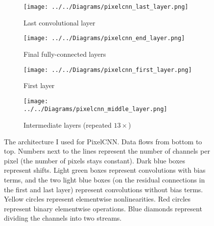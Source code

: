 \documentclass[10pt,a4paper]{article}
\begin{document}
\begin{figure}
  \centering
  \vspace{-3cm}
    \begin{subfigure}{0.45\columnwidth}
    	\addtocounter{subfigure}{2}
        \centering
        \caption{Last convolutional layer}
        \texttt{[image: ../../Diagrams/pixelcnn\_last\_layer.png]} 
        \label{pixelcnn:last}
    \end{subfigure}
    \hfill
    \begin{subfigure}{0.45\columnwidth}
        \centering
        \caption{Final fully-connected layers}
        \texttt{[image: ../../Diagrams/pixelcnn\_end\_layer.png]} 
        \label{pixelcnn:end}
    \end{subfigure}
    \vspace{1cm}
    \addtocounter{subfigure}{-4}
    \begin{subfigure}{0.45\columnwidth}
        \centering
        \caption{First layer}
        \texttt{[image: ../../Diagrams/pixelcnn\_first\_layer.png]} 
        \label{pixelcnn:first}
    \end{subfigure}
    \hfill
    \begin{subfigure}{0.45\columnwidth}
        \centering
        \caption{Intermediate layers (repeated $13\times$)}
        \texttt{[image: ../../Diagrams/pixelcnn\_middle\_layer.png]} 
        \label{pixelcnn:middle}
    \end{subfigure}
  \caption{The architecture I used for PixelCNN. Data flows from bottom to top. Numbers next to the lines represent the number of channels per pixel (the number of pixels stays constant). Dark blue boxes represent shifts. Light green boxes represent convolutions with bias terms, and the two light blue boxes (on the residual connections in the first and last layer) represent convolutions without bias terms. Yellow circles represent elementwise nonlinearities. Red circles represent binary elementwise operations. Blue diamonds represent dividing the channels into two streams.}
  \label{pixelcnn}
\end{figure}
\end{document}
